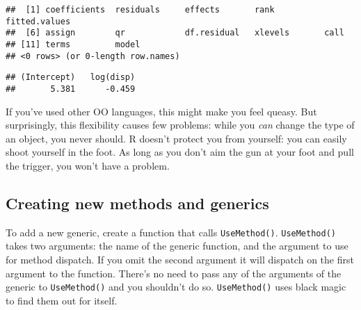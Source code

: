 \begin{verbatim}
##  [1] coefficients  residuals     effects       rank          fitted.values
##  [6] assign        qr            df.residual   xlevels       call         
## [11] terms         model        
## <0 rows> (or 0-length row.names)
\end{verbatim}

\begin{Shaded}
\begin{Highlighting}[]
\OperatorTok{$}
\end{Highlighting}
\end{Shaded}

\begin{verbatim}
## (Intercept)   log(disp) 
##       5.381      -0.459
\end{verbatim}

If you've used other OO languages, this might make you feel queasy. But
surprisingly, this flexibility causes few problems: while you \emph{can}
change the type of an object, you never should. R doesn't protect you
from yourself: you can easily shoot yourself in the foot. As long as you
don't aim the gun at your foot and pull the trigger, you won't have a
problem.

\hypertarget{creating-new-methods-and-generics}{%
\subsection{Creating new methods and
generics}\label{creating-new-methods-and-generics}}

To add a new generic, create a function that calls \texttt{UseMethod()}.
\texttt{UseMethod()} takes two arguments: the name of the generic
function, and the argument to use for method dispatch. If you omit the
second argument it will dispatch on the first argument to the function.
There's no need to pass any of the arguments of the generic to
\texttt{UseMethod()} and you shouldn't do so. \texttt{UseMethod()} uses
black magic to find them out for itself. 

\begin{Shaded}
\begin{Highlighting}[]
\StringTok{ }\NormalTok{(}\NormalTok{)}
\end{Highlighting}
\end{Shaded}

